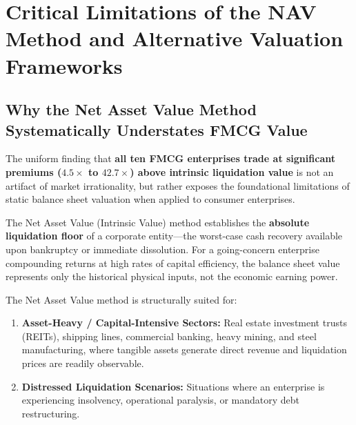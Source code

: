 
\section[Limitations \& Alternative Models]{Critical Limitations of the NAV Method and Alternative Valuation Frameworks}

\subsection{Why the Net Asset Value Method Systematically Understates FMCG Value}
The uniform finding that \textbf{all ten FMCG enterprises trade at significant premiums ($4.5\times$ to $42.7\times$) above intrinsic liquidation value} is not an artifact of market irrationality, but rather exposes the foundational limitations of static balance sheet valuation when applied to consumer enterprises.

\begin{formulabox}
The Net Asset Value (Intrinsic Value) method establishes the \textbf{absolute liquidation floor} of a corporate entity---the worst-case cash recovery available upon bankruptcy or immediate dissolution. For a going-concern enterprise compounding returns at high rates of capital efficiency, the balance sheet value represents only the historical physical inputs, not the economic earning power.
\end{formulabox}

The Net Asset Value method is structurally suited for:
\begin{enumerate}[label=\textbf{\arabic*.}]
    \item \textbf{Asset-Heavy / Capital-Intensive Sectors:} Real estate investment trusts (REITs), shipping lines, commercial banking, heavy mining, and steel manufacturing, where tangible assets generate direct revenue and liquidation prices are readily observable.
    \item \textbf{Distressed Liquidation Scenarios:} Situations where an enterprise is experiencing insolvency, operational paralysis, or mandatory debt restructuring.
\end{enumerate}

